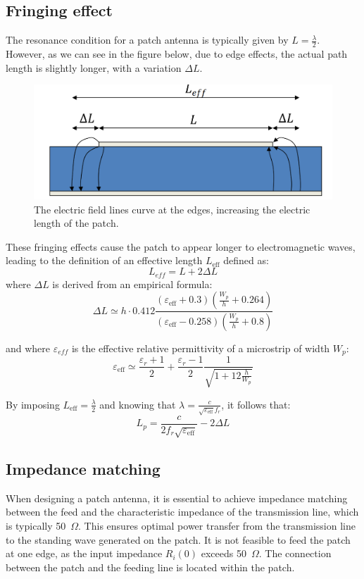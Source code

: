 \documentclass[]{article}
\begin{document}
	\subsection{Fringing effect} 
	The resonance condition for a patch antenna is typically given by \( L = \frac{\lambda}{2} \). However, as we can see in the figure below, due to edge effects, the actual path length is slightly longer, with a variation \( \Delta L \).
	\begin{figure}[h]
		\centering
		\includegraphics[width=0.4\linewidth]{img/img2}
		\caption{The electric field lines curve at the edges, increasing the electric length of the patch.}
		\label{fig:img2}
	\end{figure}
	
	
	These fringing effects cause the patch to appear longer to electromagnetic waves, leading to the definition of an effective length \( L_{\text{eff}} \) defined as: 
	\begin{equation}
		L_{eff}= L+2\Delta L
	\end{equation}
	\newpage
	where $\Delta L$ is derived from an empirical formula:
	\begin{equation}
		\Delta L \simeq h \cdot 0.412 \frac{\left( \varepsilon_\text{eff} + 0.3 \right) \left( \frac{W_p}{h} + 0.264 \right)}{\left( \varepsilon_\text{eff} - 0.258 \right) \left( \frac{W_p}{h} + 0.8 \right)}
		\label{DeltaL}
	\end{equation}
	
	and where $\varepsilon_{eff}$ is the effective relative permittivity of a microstrip of width $W_p$:
	\begin{equation}
		\varepsilon_\text{eff} \simeq \frac{\varepsilon_r + 1}{2} + \frac{\varepsilon_r - 1}{2} \frac{1}{\sqrt{1 + 12 \frac{h}{W_p}}}
		\label{Epsilon_eff}
	\end{equation}
	
	By imposing $L_\text{eff} = \frac{\lambda}{2}$ and knowing that $\lambda = \frac{c}{\sqrt{\varepsilon_\text{eff}} f_r}$, it follows that:
	\begin{equation}
		L_p = \frac{c}{2 f_r \sqrt{\varepsilon_\text{eff}}} - 2 \Delta L
		\label{Lp}
	\end{equation}
	\subsection{Impedance matching}
When designing a patch antenna, it is essential to achieve impedance matching between the feed and the characteristic impedance of the transmission line, which is typically 50~$\Omega$. This ensures optimal power transfer from the transmission line to the standing wave generated on the patch. It is not feasible to feed the patch at one edge, as the input impedance $R_i(0)$ exceeds 50~$\Omega$. The connection between the patch and the feeding line is located within the patch.
\end{document}
